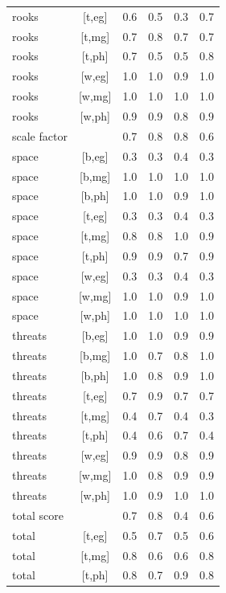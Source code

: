\documentclass{article}
\begin{document}
\begin{longtable}{lcrrrr}
 rooks & [t,eg] &      0.6 &      0.5 &      0.3 &      0.7 \\
 rooks & [t,mg] &      0.7 &      0.8 &      0.7 &      0.7 \\
 rooks & [t,ph] &      0.7 &      0.5 &      0.5 &      0.8 \\
 rooks & [w,eg] &      1.0 &      1.0 &      0.9 &      1.0 \\
 rooks & [w,mg] &      1.0 &      1.0 &      1.0 &      1.0 \\
 rooks & [w,ph] &      0.9 &      0.9 &      0.8 &      0.9 \\
scale factor &   &   0.7 &      0.8 &      0.8 &      0.6 \\
 space & [b,eg] &      0.3 &      0.3 &      0.4 &      0.3 \\
 space & [b,mg] &      1.0 &      1.0 &      1.0 &      1.0 \\
 space & [b,ph] &      1.0 &      1.0 &      0.9 &      1.0 \\
 space & [t,eg] &      0.3 &      0.3 &      0.4 &      0.3 \\
 space & [t,mg] &      0.8 &      0.8 &      1.0 &      0.9 \\
 space & [t,ph] &      0.9 &      0.9 &      0.7 &      0.9 \\
 space & [w,eg] &      0.3 &      0.3 &      0.4 &      0.3 \\
 space & [w,mg] &      1.0 &      1.0 &      0.9 &      1.0 \\
 space & [w,ph] &      1.0 &      1.0 &      1.0 &      1.0 \\
threats & [b,eg] &      1.0 &      1.0 &      0.9 &      0.9 \\
threats & [b,mg] &      1.0 &      0.7 &      0.8 &      1.0 \\
threats & [b,ph] &      1.0 &      0.8 &      0.9 &      1.0 \\
threats & [t,eg] &      0.7 &      0.9 &      0.7 &      0.7 \\
threats & [t,mg] &      0.4 &      0.7 &      0.4 &      0.3 \\
threats & [t,ph] &      0.4 &      0.6 &      0.7 &      0.4 \\
threats & [w,eg] &      0.9 &      0.9 &      0.8 &      0.9 \\
threats & [w,mg] &      1.0 &      0.8 &      0.9 &      0.9 \\
threats & [w,ph] &      1.0 &      0.9 &      1.0 &      1.0 \\
total score &  &     0.7 &      0.8 &      0.4 &      0.6 \\
 total & [t,eg] &      0.5 &      0.7 &      0.5 &      0.6 \\
 total & [t,mg] &      0.8 &      0.6 &      0.6 &      0.8 \\
 total & [t,ph] &      0.8 &      0.7 &      0.9 &      0.8 \\
\end{longtable}
\end{document}

